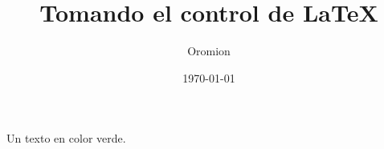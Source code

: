 \documentclass{article}
\title{Tomando el control de \LaTeX}
\author{Oromion}
\date{\today}
\begin{document}
\maketitle
\textcolor{myGreen}{Un texto en color verde.}
\end{document}
